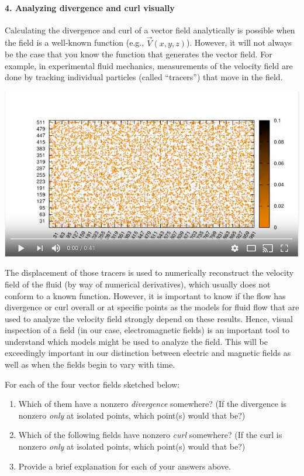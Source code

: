 \documentclass[
  letterpaperpaper,
]{article}
\providecommand{\tightlist}{%
  \setlength{\itemsep}{0pt}\setlength{\parskip}{0pt}}
\begin{document}
\hypertarget{analyzing-divergence-and-curl-visually}{%
\paragraph{4. Analyzing divergence and curl
visually}\label{analyzing-divergence-and-curl-visually}}

Calculating the divergence and curl of a vector field analytically is
possible when the field is a well-known function (e.g.,
\(\vec{V}(x,y,z)\)). However, it will not always be the case that you
know the function that generates the vector field. For example, in
experimental fluid mechanics, measurements of the velocity field are
done by tracking individual particles (called ``tracers'') that move in
the field.

\href{https://www.youtube.com/watch?v=hzvFHrWQbP0}{\includegraphics{./images/hw1/tracers.png}}

The displacement of those tracers is used to numerically reconstruct the
velocity field of the fluid (by way of numerical derivatives), which
usually does not conform to a known function. However, it is important
to know if the flow has divergence or curl overall or at specific points
as the models for fluid flow that are used to analyze the velocity field
strongly depend on these results. Hence, visual inspection of a field
(in our case, electromagnetic fields) is an important tool to understand
which models might be used to analyze the field. This will be
exceedingly important in our distinction between electric and magnetic
fields as well as when the fields begin to vary with time.

For each of the four vector fields sketched below:

\begin{enumerate}
\def\labelenumi{\arabic{enumi}.}
\tightlist
\item
  Which of them have a nonzero \emph{divergence} somewhere? (If the
  divergence is nonzero \emph{only} at isolated points, which point(s)
  would that be?)
\item
  Which of the following fields have nonzero \emph{curl} somewhere? (If
  the curl is nonzero \emph{only} at isolated points, which point(s)
  would that be?)
\item
  Provide a brief explanation for each of your answers above.
\end{enumerate}
\end{document}
